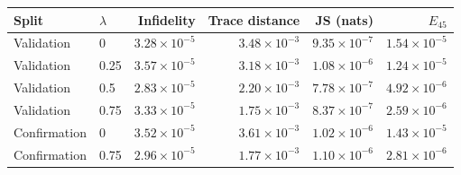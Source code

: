 \begin{tabular}{llrrrr}
\toprule
Split & $\lambda$ & Infidelity & Trace distance & JS (nats) & $E_{45}$ \\
\midrule
Validation & 0 & $3.28\times10^{-5}$ & $3.48\times10^{-3}$ & $9.35\times10^{-7}$ & $1.54\times10^{-5}$ \\
Validation & 0.25 & $3.57\times10^{-5}$ & $3.18\times10^{-3}$ & $1.08\times10^{-6}$ & $1.24\times10^{-5}$ \\
Validation & 0.5 & $2.83\times10^{-5}$ & $2.20\times10^{-3}$ & $7.78\times10^{-7}$ & $4.92\times10^{-6}$ \\
Validation & 0.75 & $3.33\times10^{-5}$ & $1.75\times10^{-3}$ & $8.37\times10^{-7}$ & $2.59\times10^{-6}$ \\
Confirmation & 0 & $3.52\times10^{-5}$ & $3.61\times10^{-3}$ & $1.02\times10^{-6}$ & $1.43\times10^{-5}$ \\
Confirmation & 0.75 & $2.96\times10^{-5}$ & $1.77\times10^{-3}$ & $1.10\times10^{-6}$ & $2.81\times10^{-6}$ \\
\bottomrule
\end{tabular}
